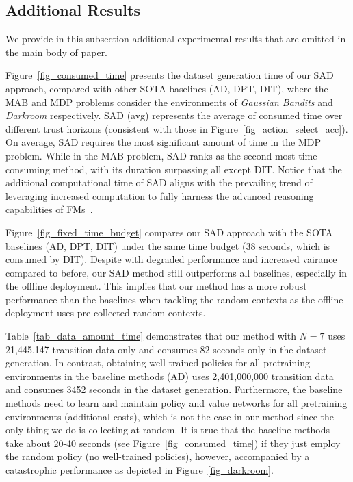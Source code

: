 \subsection{Additional Results}
\label{appendix_experiment_detail_addition_result}

We provide in this subsection additional experimental results that are omitted in the main body of paper.

Figure~\ref{fig_consumed_time} presents the dataset generation time of our SAD approach, compared with other SOTA baselines (AD, DPT, DIT), where the MAB and MDP problems consider the environments of \textit{Gaussian Bandits} and \textit{Darkroom} respectively. SAD (avg) represents the average of consumed time over different trust horizons (consistent with those in Figure~\ref{fig_action_select_acc}).
%
On average, SAD requires the most significant amount of time in the MDP problem. While in the MAB problem, SAD ranks as the second most time-consuming method, with its duration surpassing all except DIT.
%
Notice that the additional computational time of SAD aligns with the prevailing trend of leveraging increased computation to fully harness the advanced reasoning capabilities of FMs~\citep{brown2020language}.



Figure~\ref{fig_fixed_time_budget} compares our SAD approach with the SOTA baselines (AD, DPT, DIT) under the same time budget (38 seconds, which is consumed by DIT). 
%
Despite with degraded performance and increased vairance compared to before, our SAD method still outperforms all baselines, especially in the offline deployment. This implies that our method has a more robust performance than the baselines when tackling the random contexts as the offline deployment uses pre-collected random contexts. 


Table~\ref{tab_data_amount_time} demonstrates that our method with $N=7$ uses 21,445,147 transition data only and consumes 82 seconds only in the dataset generation. In contrast, obtaining well-trained policies for all pretraining environments in the baseline methods (AD) uses 2,401,000,000 transition data and consumes 3452 seconds in the dataset generation. Furthermore, the baseline methods need to learn and maintain policy and value networks for all pretraining environments (additional costs), which is not the case in our method since the only thing we do is collecting at random. It is true that the baseline methods take about 20-40 seconds (see Figure~\ref{fig_consumed_time}) if they just employ the random policy (no well-trained policies), however, accompanied by a catastrophic performance as depicted in Figure~\ref{fig_darkroom}.




